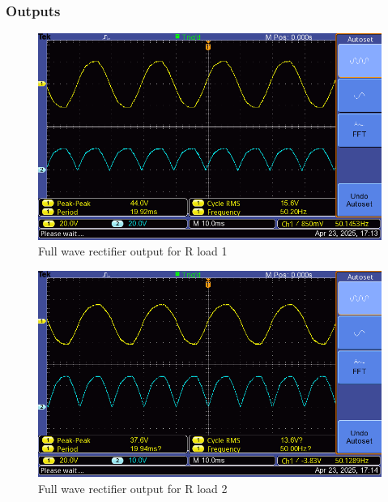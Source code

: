 \documentclass[12pt]{article}
\begin{document}
\subsubsection*{Outputs}
\begin{figure}[H]
    \centering
    \includegraphics[width=.7\textwidth]{full_r_load3.png}
    \caption{Full wave rectifier output for R load 1}
    \label{fig:rLoad}
\end{figure}

\begin{figure}[H]
    \centering
    \includegraphics[width=.7\textwidth]{full_r_load5.png}
    \caption{Full wave rectifier output for R load 2}
    \label{fig:rLoadDelay}
\end{figure}


\renewcommand{\bibname}{References}

\end{document}
